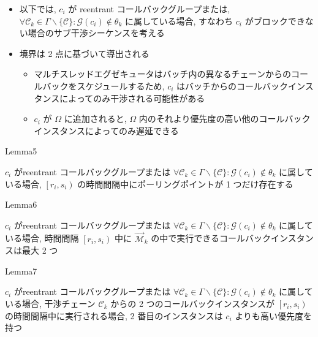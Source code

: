 \begin{frame}{}
    \begin{itemize}
        \item 以下では, $c_{i}$ が reentrant コールバックグループまたは, $\forall \mathcal{C}_{k} \in \Gamma \backslash\{\mathcal{C}\}: \mathcal{G}\left(c_{i}\right) \notin \theta_{k}$ に属している場合, すなわち $c_{i}$ がブロックできない場合のサブ干渉シーケンスを考える
        \item 境界は 2 点に基づいて導出される
              \begin{itemize}
                  \item マルチスレッドエグゼキュータはバッチ内の異なるチェーンからのコールバックをスケジュールするため, $c_{i}$ はバッチからのコールバックインスタンスによってのみ干渉される可能性がある
                  \item $c_{i}$ が $\Omega$ に追加されると, $\Omega$ 内のそれより優先度の高い他のコールバックインスタンスによってのみ遅延できる
              \end{itemize}
    \end{itemize}
\end{frame}

\begin{frame}{Lemma5}
    \begin{lemma}[]
        $c_{i}$ がreentrant コールバックグループまたは $\forall \mathcal{C}_{k} \in \Gamma \backslash\{\mathcal{C}\}: \mathcal{G}\left(c_{i}\right) \notin \theta_{k}$ に属している場合, $\left[r_{i}, s_{i}\right)$ の時間間隔中にポーリングポイントが 1 つだけ存在する
    \end{lemma}
\end{frame}


\begin{frame}{Lemma6}
    \begin{lemma}[]
        $c_{i}$ がreentrant コールバックグループまたは $\forall \mathcal{C}_{k} \in \Gamma \backslash\{\mathcal{C}\}: \mathcal{G}\left(c_{i}\right) \notin \theta_{k}$ に属している場合, 時間間隔 $\left[r_{i}, s_{i}\right)$ 中に $\overrightarrow{\mathcal{M}}_{k}$ の中で実行できるコールバックインスタンスは最大 2 つ
    \end{lemma}
\end{frame}

\begin{frame}{Lemma7}
    \begin{lemma}[]
        $c_{i}$ がreentrant コールバックグループまたは $\forall \mathcal{C}_{k} \in \Gamma \backslash\{\mathcal{C}\}: \mathcal{G}\left(c_{i}\right) \notin \theta_{k}$ に属している場合, 干渉チェーン $\mathcal{C}_{k}$ からの 2 つのコールバックインスタンスが $\left[r_{i}, s_{i}\right)$ の時間間隔中に実行される場合, 2 番目のインスタンスは $c_{i}$ よりも高い優先度を持つ
    \end{lemma}
\end{frame}

